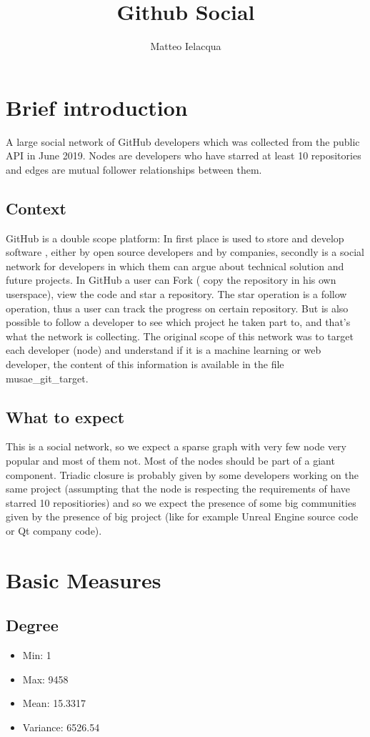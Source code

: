 \documentclass[]{article}
\begin{document}
\author{Matteo Ielacqua}
\title{Github Social}
\maketitle
    \section{Brief introduction}
    A large social network of GitHub developers which was collected from the public API in June 2019. Nodes are developers who have starred at least 10 repositories and edges are mutual follower relationships between them.
    \subsection*{Context}
    GitHub is a double scope platform: In first place is used to store and develop software , either by open source developers and by companies, secondly is a social network for developers in which them can argue about technical solution and future projects. In GitHub a user can Fork ( copy the repository in his own userspace), view the code and star a repository. The star operation is a follow operation, thus a user can track the progress on certain repository. But is also possible to follow a developer to see which project he taken part to, and that's what the network is collecting. The original scope of this network was to target each developer (node) and understand if it is a machine learning or web developer, the content of this information is available in the file musae_git_target.
    \subsection*{What to expect}
    This is a social network, so we expect a sparse graph with very few node very popular and most of them not. Most of the nodes should be part of a giant component. Triadic closure is probably given by some developers working on the same project (assumpting that the node is respecting the requirements of have starred 10 repositiories) and so we expect the presence of some big communities given by the presence of big project (like for example Unreal Engine source code or Qt company code).  

    \section{Basic Measures}
    
    \subsection*{Degree}
    \begin{itemize}
        \item Min: 1
        \item Max: 9458
        \item Mean: 15.3317
        \item Variance: 6526.54
    \end{itemize}
\end{document}
